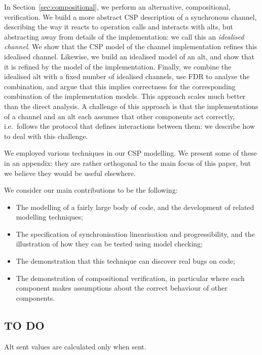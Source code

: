 In Section~\ref{sec:compositional}, we perform an alternative, compositional,
verification.  We build a more abstract CSP description of a synchronous
channel, describing the way it reacts to operation calls and interacts with
alts, but abstracting away from details of the implementation: we call this an
\emph{idealised channel}.  We show that the CSP model of the channel
implementation refines this idealised channel.  Likewise, we build an
idealised model of an alt, and show that it is refined by the model of the
implementation.  Finally, we combine the idealised alt with a fixed number of
idealised channels, use FDR to analyse the combination, and argue that this
implies correctness for the corresponding combination of the implementation
models.  This approach scales much better than the direct analysis.  A
challenge of this approach is that the implementations of a channel and an alt
each assumes that other components act correctly, i.e.~follows the protocol
that defines interactions between them: we describe how to deal with this
challenge.

\framebox{\ldots}

We employed various techniques in our CSP modelling.  We present some of these
in an appendix: they are rather orthogonal to the main focus of this paper,
but we believe they would be useful elsewhere.

We consider our main contributions to be the following:
%
\begin{itemize}
\item The modelling of a fairly large body of code, and the development of
  related modelling techniques;

\item The specification of synchronisation linearisation and progressibility,
  and the illustration of how they can be tested using model checking; 

\item The demonstration that this technique can discover real bugs on code;

\item The demonstration of compositional verification, in particular where
  each component makes assumptions about the correct behaviour of other
  components. 
\end{itemize}



\subsection{TO DO}

Alt sent values are calculated only when sent.  
